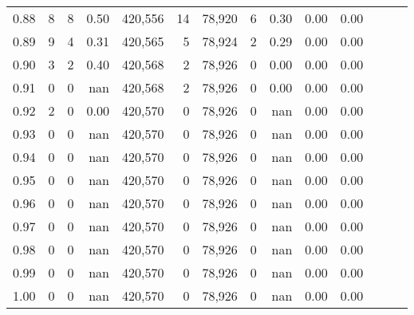 \begin{tabular}{rrrrrrrrrrrrrr}
0.88 &       8 &      8 &  0.50 &  420,556 &       14 &  78,920 &       6 &  0.30 &  0.00 &      0.00 \\
0.89 &       9 &      4 &  0.31 &  420,565 &        5 &  78,924 &       2 &  0.29 &  0.00 &      0.00 \\
0.90 &       3 &      2 &  0.40 &  420,568 &        2 &  78,926 &       0 &  0.00 &  0.00 &      0.00 \\
0.91 &       0 &      0 &   nan &  420,568 &        2 &  78,926 &       0 &  0.00 &  0.00 &      0.00 \\
0.92 &       2 &      0 &  0.00 &  420,570 &        0 &  78,926 &       0 &   nan &  0.00 &      0.00 \\
0.93 &       0 &      0 &   nan &  420,570 &        0 &  78,926 &       0 &   nan &  0.00 &      0.00 \\
0.94 &       0 &      0 &   nan &  420,570 &        0 &  78,926 &       0 &   nan &  0.00 &      0.00 \\
0.95 &       0 &      0 &   nan &  420,570 &        0 &  78,926 &       0 &   nan &  0.00 &      0.00 \\
0.96 &       0 &      0 &   nan &  420,570 &        0 &  78,926 &       0 &   nan &  0.00 &      0.00 \\
0.97 &       0 &      0 &   nan &  420,570 &        0 &  78,926 &       0 &   nan &  0.00 &      0.00 \\
0.98 &       0 &      0 &   nan &  420,570 &        0 &  78,926 &       0 &   nan &  0.00 &      0.00 \\
0.99 &       0 &      0 &   nan &  420,570 &        0 &  78,926 &       0 &   nan &  0.00 &      0.00 \\
1.00 &       0 &      0 &   nan &  420,570 &        0 &  78,926 &       0 &   nan &  0.00 &      0.00 \\
\bottomrule
\end{tabular}
